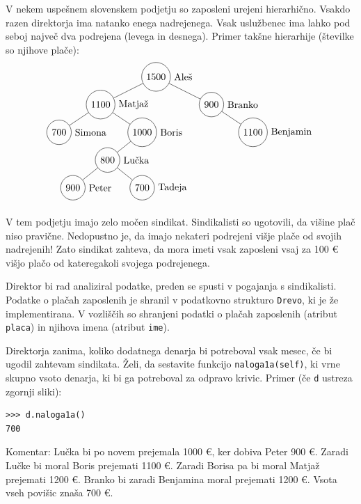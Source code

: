 \documentclass[arhiv]{../izpit}
\begin{document}

V nekem uspešnem slovenskem podjetju so zaposleni urejeni hierarhično. Vsakdo razen direktorja ima natanko enega nadrejenega. Vsak uslužbenec ima lahko pod seboj največ dva podrejena (levega in desnega). Primer takšne hierarhije (številke so njihove plače):
$$
\begin{tikzpicture}[level distance=1cm,
    level 1/.style={sibling distance=4.0cm},
    level 2/.style={sibling distance=3cm},
    level 3/.style={sibling distance=2.5cm}
    ]
    \node[circle, draw, label=0:Aleš] (d) {1500}
      child {node[circle, draw, label=0:Matjaž] {1100}
        child {node[circle, draw, label=0:Simona] {700}}
        child {node[circle, draw, label=0:Boris] {1000}
          child {node[circle, draw, label=0:Lučka] {800}
             child {node[circle, draw, label=0:Peter] {900}}
             child {node[circle, draw, label=0:Tadeja] {700}}
          }
          child[missing]{}
        }
      }
      child {node[circle, draw, label=0:Branko] {900}
        child[missing] {} 
        child {node[circle, draw, label=0:Benjamin] {1100}}
      }; 
  \end{tikzpicture}
$$

V tem podjetju imajo zelo močen sindikat. Sindikalisti so ugotovili, da višine plač niso pravične. Nedopustno je, da imajo nekateri podrejeni višje plače od svojih nadrejenih! Zato sindikat zahteva, da mora imeti vsak zaposleni vsaj za 100 \euro{} višjo plačo od kateregakoli svojega podrejenega.

Direktor bi rad analiziral podatke, preden se spusti v pogajanja s sindikalisti. Podatke o plačah zaposlenih je shranil v podatkovno strukturo \texttt{Drevo}, ki je že implementirana. V vozliščih so shranjeni podatki o plačah zaposlenih (atribut \verb+placa+) in njihova imena (atribut \verb+ime+).

\podnaloga[10 točk]
Direktorja zanima, koliko dodatnega denarja bi potreboval vsak mesec, če bi ugodil zahtevam sindikata. Želi, da sestavite funkcijo \texttt{naloga1a(self)}, ki vrne skupno vsoto denarja, ki bi ga potreboval za odpravo krivic. Primer (če \texttt{d} ustreza zgornji sliki):
%
\begin{verbatim}
>>> d.naloga1a()
700
\end{verbatim}
Komentar: Lučka bi po novem prejemala 1000 \euro, ker dobiva Peter 900 \euro. Zaradi Lučke bi moral  Boris prejemati 1100 \euro. Zaradi Borisa pa bi moral Matjaž prejemati 1200 \euro. Branko bi zaradi Benjamina moral prejemati 1200 \euro. Vsota vseh povišic znaša 700 \euro.
\end{document}
